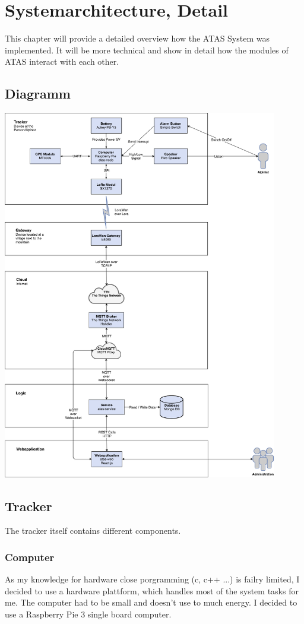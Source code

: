 \documentclass[a4paper,11pt, oneside]{report}
\theoremstyle{definition}
\begin{document}
\chapter{Systemarchitecture, Detail}
This chapter will provide a detailed overview how the ATAS System was implemented. It will be more technical and show in detail how the modules of ATAS interact with each other.


\newpage
\noindent
\section{Diagramm}
\includegraphics[width=0.9\textwidth]{img/ATAS_SystemOverview_Detail.png}

\newpage
\section{Tracker}
The tracker itself contains different components.

\subsection{Computer}
As my knowledge for hardware close porgramming (c, c++ ...) is failry limited, I decided to use a hardware plattform, which handles most of the system tasks for me. The computer had to be small and doesn't use to much energy. I decided to use a Raspberry Pie 3  single board computer.
\end{document}
